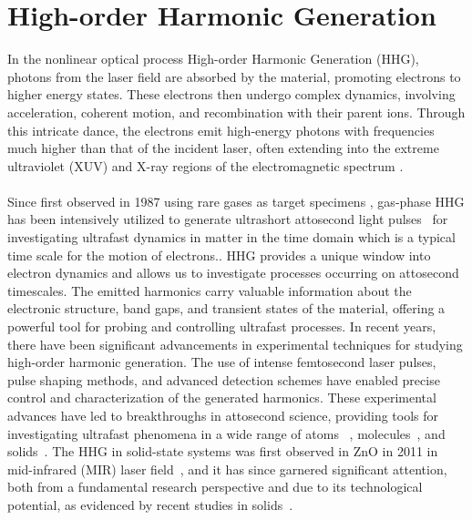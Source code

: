\section{High-order Harmonic Generation}
In the nonlinear optical process High-order Harmonic Generation (\gls{HHG}), photons from the laser field are absorbed by the material, promoting electrons to higher energy states. These electrons then undergo complex dynamics, involving acceleration, coherent motion, and recombination with their parent ions. Through this intricate dance, the electrons emit high-energy photons with frequencies much higher than that of the incident laser, often extending into the extreme ultraviolet (XUV) and X-ray regions of the electromagnetic spectrum \cite{gaumnitz2017streaking}.\\
\\
Since first observed in 1987 using rare gases as target specimens \cite{McPherson:87, Ferray_1988},  gas-phase HHG has been intensively utilized to generate ultrashort attosecond light pulses~\cite{PhysRevLett.68.3535, PhysRevLett.70.1599, PhysRevA.49.2117} for investigating ultrafast dynamics in matter in the time domain which is a typical time scale for the motion of electrons.\cite{baltuvska2003attosecond, Goulielmakis2010, doi:10.1126/science.1260311, doi:10.1126/science.aag1268}. HHG provides a unique window into electron dynamics and allows us to investigate processes occurring on attosecond timescales. The emitted harmonics carry valuable information about the electronic structure, band gaps, and transient states of the material, offering a powerful tool for probing and controlling ultrafast processes.
In recent years, there have been significant advancements in experimental techniques for studying high-order harmonic generation. The use of intense femtosecond laser pulses, pulse shaping methods, and advanced detection schemes have enabled precise control and characterization of the generated harmonics. These experimental advances have led to breakthroughs in attosecond science, providing tools for investigating ultrafast phenomena in a wide range of atoms ~\cite{Goulielmakis2010,PhysRevLett.105.143002,PhysRevLett.106.123601}, molecules~\cite{Warrick2016,Reduzzi2016,PhysRevResearch.3.043222}, and solids~\cite{doi:10.1126/science.1260311, doi:10.1126/science.aag1268, Mashiko2016,Siegrist2019, vampa2017merge}. 
The HHG in solid-state systems was first observed in ZnO in 2011 in mid-infrared (MIR) laser field~\cite{Ghimire2011}, and it has since garnered significant attention, both from a fundamental research perspective and due to its technological potential, as evidenced by recent studies in solids~\cite{Ghimire2019, Silva2019, Nakagawa2022,gorlach2022high, neufeld2023universal}.


